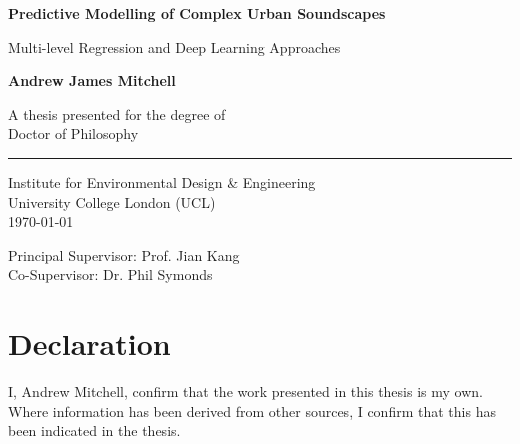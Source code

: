 \documentclass[oneside,fontsize=12pt,titlepage]{scrbook}
\begin{document}
\frontmatter
{}
\begin{titlepage}
      \AddToShipoutPicture*{}
      \begin{center}
            \vspace*{3cm}

            \Huge
            \textbf{Predictive Modelling of Complex Urban Soundscapes}

            \vspace{0.5cm}
            \LARGE
            Multi-level Regression and Deep Learning Approaches

            \vspace{1.5cm}

            \textbf{Andrew James Mitchell}

            \vfill
            A thesis presented for the degree of\\
            Doctor of Philosophy\\
            \rule[-.5cm]{0.5\textwidth}{1pt}

            \vspace{1.5cm}

            \Large
            Institute for Environmental Design \& Engineering\\
            University College London (UCL)\\
            \today

            \vspace{1cm}

            Principal Supervisor: Prof. Jian Kang\\
            Co-Supervisor: Dr. Phil Symonds

      \end{center}
\end{titlepage}


\restoregeometry


\chapter*{Declaration}
I, Andrew Mitchell, confirm that the work presented in this thesis is my own. Where information has been derived from other sources, I confirm that this has been indicated in the thesis.
\end{document}
